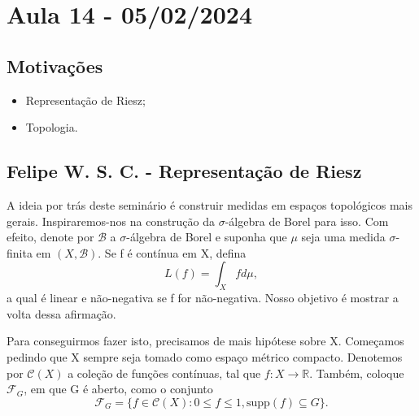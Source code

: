 \documentclass[measure_theory.tex]{subfiles}
\begin{document}
\section{Aula 14 - 05/02/2024}
\subsection{Motivações}
\begin{itemize}
	\item Representação de Riesz;
	\item Topologia.
\end{itemize}
\subsection{Felipe W. S. C. - Representação de Riesz}
A ideia por trás deste seminário é construir medidas em espaços topológicos mais gerais. Inspiraremos-nos na construção da \(\sigma \)-álgebra de Borel para isso.
Com efeito, denote por \(\mathcal{B}\) a \(\sigma \)-álgebra de Borel e suponha que \(\mu \) seja uma medida \(\sigma \)-finita em \((X, \mathcal{B})\). Se f é contínua em X, defina
\[
	L(f) = \int_{X}^{}fd\mu,
\]
a qual é linear e não-negativa se f for não-negativa. Nosso objetivo é mostrar a volta dessa afirmação.

Para conseguirmos fazer isto, precisamos de mais hipótese sobre X. Começamos pedindo que X sempre seja tomado como espaço métrico compacto. Denotemos por
\(\mathcal{C}(X)\) a coleção de funções contínuas, tal que \(f:X\rightarrow \mathbb{R}\). Também, coloque \(\mathcal{F}_{G}\), em que G é aberto, como o conjunto
\[
	\mathcal{F}_{G} = \{f\in \mathcal{C}(X): 0 \leq f \leq 1, \mathrm{supp}(f)\subseteq G\}.
\]
\end{document}
